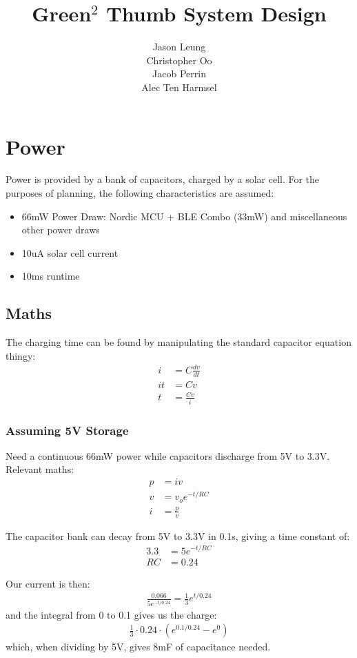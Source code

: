 \documentclass{article}
\begin{document}
\title{Green$^2$ Thumb System Design}
\author{
    Jason Leung\\
    Christopher Oo\\
    Jacob Perrin\\
    Alec Ten Harmsel
}
\date{}
\maketitle

\section{Power}
Power is provided by a bank of capacitors, charged by a solar cell. For the
purposes of planning, the following characteristics are assumed:

\begin{itemize}
    \item 66mW Power Draw: Nordic MCU + BLE Combo (33mW) and miscellaneous
        other power draws
    \item 10uA solar cell current
    \item 10ms runtime
\end{itemize}

\subsection{Maths}

The charging time can be found by manipulating the standard capacitor equation
thingy: \begin{align*}
    i & = C\frac{dv}{dt}\\
    it & = Cv\\
    t & = \frac{Cv}{i}
\end{align*}

\subsubsection{Assuming 5V Storage}
Need a continuous 66mW power while capacitors discharge from 5V to 3.3V.
Relevant maths: \begin{align*}
    p & = iv\\
    v & = v_oe^{-t/RC}\\
    i & = \frac{p}{v}
\end{align*}

The capacitor bank can decay from 5V to 3.3V in 0.1s, giving a time constant
of: \begin{align*}
    3.3 & = 5e^{-t/RC}\\
    RC & = 0.24
\end{align*}

Our current is then: \begin{align*}
    \frac{0.066}{5e^{-t/0.24}} = \frac{1}{3}e^{t/0.24}
\end{align*} and the integral from 0 to 0.1 gives us the charge: \begin{align*}
    \frac{1}{3} \cdot 0.24 \cdot \left(e^{0.1/0.24} - e^{0}\right)
\end{align*} which, when dividing by 5V, gives 8mF of capacitance needed.
\end{document}

